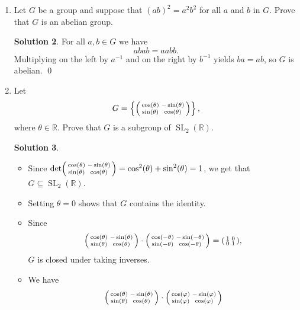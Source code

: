 \documentclass{article}
\newcommand{\RR}{\mathbb{R}}
\DeclareMathOperator{\SL}{SL}
\theoremstyle{definition}
\newtheorem*{solution}{Solution}
\begin{document}
\begin{enumerate}
\begin{solution}
\end{solution}
\item[3.33.] Let $G$ be a group and suppose that $(ab)^2 = a^2b^2$ for all $a$ and $b$ in $G$. Prove that $G$ is an abelian group.
\begin{solution}
For all $a, b \in G$ we have
\[
abab = aabb.
\]
Multiplying on the left by $a^{-1}$ and on the right by $b^{-1}$ yields $ba = ab$, so $G$ is abelian. \qed
\end{solution}
\item[3.40.]  Let 
\[
G = \left\{\begin{psmallmatrix} \cos(\theta) & -\sin(\theta) \\ \sin(\theta) & \cos(\theta) \end{psmallmatrix}\right\},
\]
where $\theta \in \RR$.  Prove that $G$ is a subgroup of $\SL_2(\RR)$.
\begin{solution} $ $
\begin{itemize}
\item Since $\det \begin{psmallmatrix} \cos(\theta) & -\sin(\theta) \\ \sin(\theta) & \cos(\theta) \end{psmallmatrix} = \cos^2(\theta) + \sin^2(\theta) = 1$, we get that $G \subseteq \SL_2(\RR)$.
\item Setting $\theta = 0$ shows that $G$ contains the identity.
\item Since
\[
\begin{psmallmatrix} \cos(\theta) & -\sin(\theta) \\ \sin(\theta) & \cos(\theta) \end{psmallmatrix} \cdot \begin{psmallmatrix} \cos(-\theta) & -\sin(-\theta) \\ \sin(-\theta) & \cos(-\theta) \end{psmallmatrix} = \begin{psmallmatrix} 1 & 0 \\ 0 & 1 \end{psmallmatrix},
\]
$G$ is closed under taking inverses.
\item We have
\begin{align*}
\begin{psmallmatrix} \cos(\theta) & -\sin(\theta) \\ \sin(\theta) & \cos(\theta) \end{psmallmatrix} \cdot \begin{psmallmatrix} \cos(\varphi) & -\sin(\varphi) \\ \sin(\varphi) & \cos(\varphi) \end{psmallmatrix} 

\end{align*}
\end{itemize}
\end{solution}
\end{enumerate}
\end{document}
